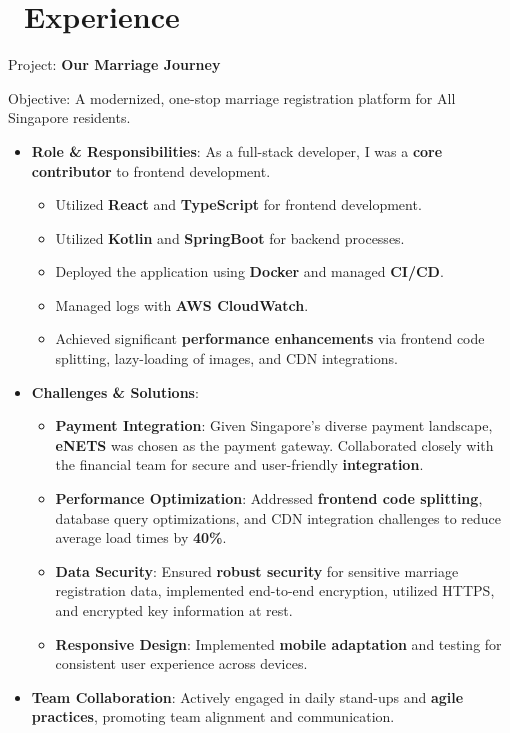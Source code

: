 \documentclass{resume}
\begin{document}
\onehalfspacing
{}



\section{\faUsers\ Experience}
\role{Software Developer}

Project: \textbf{Our Marriage Journey}

Objective: A modernized, one-stop marriage registration platform for All Singapore residents.
\begin{itemize}
  \item \textbf{Role \& Responsibilities}: As a full-stack developer, I was a \textbf{core contributor} to frontend development.
  \begin{itemize}
    \item Utilized \textbf{React} and \textbf{TypeScript} for frontend development.
    \item Utilized \textbf{Kotlin} and \textbf{SpringBoot} for backend processes.
    \item Deployed the application using \textbf{Docker} and managed \textbf{CI/CD}.
    \item Managed logs with \textbf{AWS CloudWatch}.
    \item Achieved significant \textbf{performance enhancements} via frontend code splitting, lazy-loading of images, and CDN integrations.
  \end{itemize}
  
  \item \textbf{Challenges \& Solutions}:
  \begin{itemize}
    \item \textbf{Payment Integration}: Given Singapore's diverse payment landscape, \textbf{eNETS} was chosen as the payment gateway. Collaborated closely with the financial team for secure and user-friendly \textbf{integration}.
    \item \textbf{Performance Optimization}: Addressed \textbf{frontend code splitting}, database query optimizations, and CDN integration challenges to reduce average load times by \textbf{40\%}.
    \item \textbf{Data Security}: Ensured \textbf{robust security} for sensitive marriage registration data, implemented end-to-end encryption, utilized HTTPS, and encrypted key information at rest.
    \item \textbf{Responsive Design}: Implemented \textbf{mobile adaptation} and testing for consistent user experience across devices.
  \end{itemize}
  
  \item \textbf{Team Collaboration}: Actively engaged in daily stand-ups and \textbf{agile practices}, promoting team alignment and communication.
\end{itemize}
\end{document}
